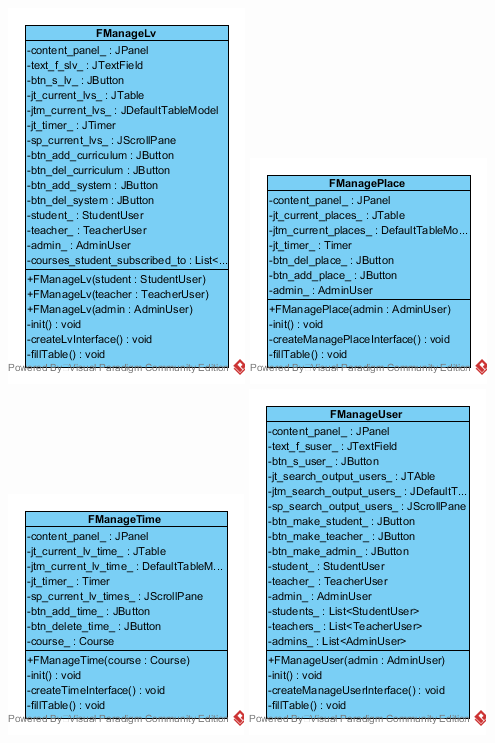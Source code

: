 \documentclass[a4paper,12pt]{article}
\begin{document}
\begin{center}
	\includegraphics[scale=1]{cFManageLv.png}
	\includegraphics[scale=1]{cFManagePlace.png}
	\includegraphics[scale=1]{cFManageTime.png}
	\includegraphics[scale=1]{cFManageUser.png}

\end{center}
\end{document}
